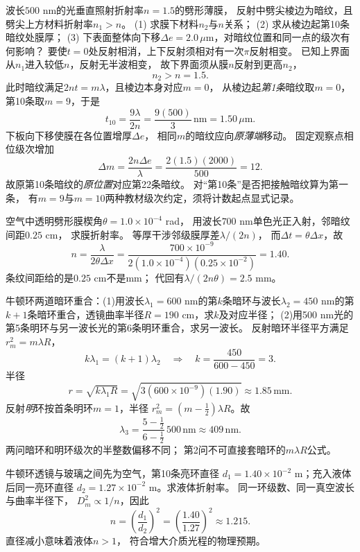 \problemtext 波长$500$ nm的光垂直照射折射率$n=1.5$的劈形薄膜，
反射中劈尖棱边为暗纹，且劈尖上方材料折射率$n_1>n$。
(1) 求膜下材料$n_2$与$n$关系；
(2) 求从棱边起第10条暗纹处膜厚；
(3) 下表面整体向下移$\Delta e=2.0\,\mu$m，对暗纹位置和同一点的级次有何影响？
\workings
要使$t=0$处反射相消，上下反射须相对有一次$\pi$反射相变。
已知上界面从$n_1$进入较低$n$，反射无半波相变，
故下界面须从膜$n$反射到更高$n_2$，
\[
\boxed{n_2>n=1.5}.
\]
此时暗纹满足$2nt=m\lambda$，且棱边本身对应$m=0$，
从棱边起\emph{第1条}暗纹取$m=0$，
第10条取$m=9$，于是
\[
\boxed{t_{10}=\frac{9\lambda}{2n}
=\frac{9(500)}{3}\,\mathrm{nm}=1.50\,\mu\mathrm m}.
\]
下板向下移使膜在各位置增厚$\Delta e$，
相同$m$的暗纹应向\emph{原薄端}移动。
固定观察点相位级次增加
\[
\boxed{\Delta m=\frac{2n\Delta e}{\lambda}
=\frac{2(1.5)(2000)}{500}=12}.
\]
故原第10条暗纹的\emph{原位置}对应第22条暗纹。
\crosscheck 对“第10条”是否把接触暗纹算为第一条，
有$m=9$与$m=10$两种教材级次约定，须将计数起点显式记录。

\problemtext 空气中透明劈形膜楔角$\theta=1.0\times10^{-4}$ rad，
用波长$700$ nm单色光正入射，邻暗纹间距$0.25$ cm，
求膜折射率。
\workings
等厚干涉邻级膜厚差$\lambda/(2n)$，
而$\Delta t=\theta\Delta x$，故
\[
\boxed{n=\frac{\lambda}{2\theta\Delta x}
=\frac{700\times10^{-9}}{2(1.0\times10^{-4})(0.25\times10^{-2})}
=1.40}.
\]
\crosscheck 条纹间距给的是$0.25$ cm不是mm；
代回有$\lambda/(2n\theta)=2.5$ mm。

\problemtext 牛顿环两道暗环重合：(1)用波长$\lambda_1=600$ nm的第$k$条暗环与波长$\lambda_2=450$ nm的第$k+1$条暗环重合，透镜曲率半径$R=190$ cm，求$k$及对应半径；
(2)用500 nm光的第5条明环与另一波长光的第6条明环重合，求另一波长。
\workings
反射暗环半径平方满足$r_m^2=m\lambda R$，
\[
k\lambda_1=(k+1)\lambda_2
\quad\Longrightarrow\quad
\boxed{k=\frac{450}{600-450}=3}.
\]
半径
\[
\boxed{r=\sqrt{k\lambda_1R}
=\sqrt{3(600\times10^{-9})(1.90)}
\approx1.85\,\mathrm{mm}}.
\]
反射\emph{明}环按首条明环$m=1$，半径
$r_m^2=(m-\tfrac12)\lambda R$。故
\[
\boxed{\lambda_3=\frac{5-\tfrac12}{6-\tfrac12}\,500\,\mathrm{nm}
\approx409\,\mathrm{nm}}.
\]
\crosscheck 两问暗环和明环级次的半整数偏移不同；
第2问不可直接套暗环的$m\lambda R$公式。

\problemtext 牛顿环透镜与玻璃之间先为空气，第10条亮环直径
$d_1=1.40\times10^{-2}$ m；充入液体后同一亮环直径
$d_2=1.27\times10^{-2}$ m。求液体折射率。
\workings
同一环级数、同一真空波长与曲率半径下，
$D_m^2\propto1/n$，因此
\[
\boxed{n=\left(\frac{d_1}{d_2}\right)^2
=\left(\frac{1.40}{1.27}\right)^2\approx1.215}.
\]
\crosscheck 直径减小意味着液体$n>1$，
符合增大介质光程的物理预期。
